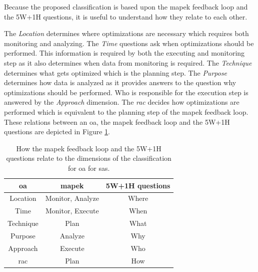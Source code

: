 \noindent Because the proposed classification is based upon the \acrshort{mapek} feedback loop and the 5W+1H questions,
it is useful to understand how they relate to each other.

\noindent The \textit{Location} determines where optimizations are necessary which requires both monitoring and analyzing.
The \textit{Time} questions ask when optimizations should be performed.
This information is required by both the executing and monitoring step as it also determines when data from monitoring is required.
The \textit{Technique} determines what gets optimized which is the planning step.
The \textit{Purpose} determines how data is analyzed as it provides answers to the question why optimizations should be performed.
Who is responsible for the execution step is answered by the \textit{Approach} dimension.
The \textit{\acrshort{rac}} decides how optimizations are performed which is equivalent to the planning step of the \acrshort{mapek} feedback loop.
These relations between an \acrshort{oa}, the \acrshort{mapek} feedback loop and the 5W+1H questions are depicted in Figure \ref{tab:MapeQuestionsOA}.

\begin{table}[h]
    \centering
    \begin{tabular}{|c|c|c|}
        \hline
        \textbf{\acrshort{oa}} & \textbf{\acrshort{mapek}} & \textbf{5W+1H questions} \\
        \hline
        \hline
        Location & Monitor, Analyze & Where \\
        \hline
        Time & Monitor, Execute & When \\
        \hline
        Technique & Plan & What \\
        \hline
        Purpose & Analyze & Why \\
        \hline
        Approach & Execute & Who \\
        \hline
        \acrshort{rac} & Plan & How \\
        \hline
    \end{tabular}
    \caption{How the \acrshort{mapek} feedback loop \cite*{VisionOfAutonomicComputing}
    and the 5W+1H questions \cite{LandscapeAndResearchChallenges}
    relate to the dimensions of the classification for \acrshort{oa} for \acrshort{sas}.}
    \label{tab:MapeQuestionsOA}
\end{table}